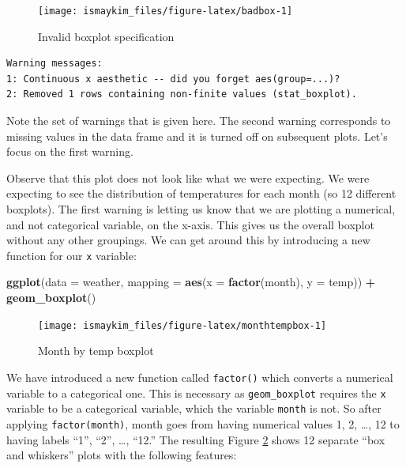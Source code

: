 \documentclass[12pt,]{krantz}
\makeatletter
\newenvironment{Shaded}{\begin{snugshade}}{\end{snugshade}}
\newcommand{\KeywordTok}[1]{\textcolor[rgb]{0.27,0.27,0.27}{\textbf{#1}}}
\newcommand{\DataTypeTok}[1]{\textcolor[rgb]{0.27,0.27,0.27}{#1}}
\newcommand{\StringTok}[1]{\textcolor[rgb]{0.5,0.5,0.5}{#1}}
\newcommand{\OperatorTok}[1]{\textcolor[rgb]{0.43,0.43,0.43}{\textbf{#1}}}
\newcommand{\NormalTok}[1]{#1}
\newenvironment{kframe}{%
\medskip{}
\setlength{\fboxsep}{.8em}
 \def\at@end@of@kframe{}%
 \ifinner\ifhmode%
  \def\at@end@of@kframe{\end{minipage}}%
  \begin{minipage}{\columnwidth}%
 \fi\fi%
 \def\FrameCommand##1{\hskip\@totalleftmargin \hskip-\fboxsep
 \colorbox{shadecolor}{##1}\hskip-\fboxsep
     \hskip-\linewidth \hskip-\@totalleftmargin \hskip\columnwidth}%
 \MakeFramed {\advance\hsize-\width
   \@totalleftmargin\z@ \linewidth\hsize
   \@setminipage}}%
 {\par\unskip\endMakeFramed%
 \at@end@of@kframe}
\renewenvironment{Shaded}{\begin{kframe}}{\end{kframe}}
\theoremstyle{definition}
\theoremstyle{definition}
\theoremstyle{definition}
\theoremstyle{remark}
\makeatother
\begin{document}
\begin{figure}

{\centering \texttt{[image: ismaykim\_files/figure-latex/badbox-1]} 

}

\caption{Invalid boxplot specification}\label{fig:badbox}
\end{figure}

\begin{verbatim}
Warning messages:
1: Continuous x aesthetic -- did you forget aes(group=...)? 
2: Removed 1 rows containing non-finite values (stat_boxplot). 
\end{verbatim}

Note the set of warnings that is given here. The second warning
corresponds to missing values in the data frame and it is turned off on
subsequent plots. Let's focus on the first warning.

Observe that this plot does not look like what we were expecting. We
were expecting to see the distribution of temperatures for each month
(so 12 different boxplots). The first warning is letting us know that we
are plotting a numerical, and not categorical variable, on the x-axis.
This gives us the overall boxplot without any other groupings. We can
get around this by introducing a new function for our \texttt{x}
variable:

\begin{Shaded}
\begin{Highlighting}[]
\KeywordTok{ggplot}\NormalTok{(}\DataTypeTok{data =}\NormalTok{ weather, }\DataTypeTok{mapping =} \KeywordTok{aes}\NormalTok{(}\DataTypeTok{x =} \KeywordTok{factor}\NormalTok{(month), }\DataTypeTok{y =}\NormalTok{ temp)) }\OperatorTok{+}
\StringTok{  }\KeywordTok{geom_boxplot}\NormalTok{()}
\end{Highlighting}
\end{Shaded}

\begin{figure}

{\centering \texttt{[image: ismaykim\_files/figure-latex/monthtempbox-1]} 

}

\caption{Month by temp boxplot}\label{fig:monthtempbox}
\end{figure}

We have introduced a new function called \texttt{factor()} which
converts a numerical variable to a categorical one. This is necessary as
\texttt{geom\_boxplot} requires the \texttt{x} variable to be a
categorical variable, which the variable \texttt{month} is not. So after
applying \texttt{factor(month)}, month goes from having numerical values
1, 2, \ldots{}, 12 to having labels ``1'', ``2'', \ldots{}, ``12.'' The
resulting Figure \ref{fig:monthtempbox} shows 12 separate ``box and
whiskers'' plots with the following features:
\end{document}
